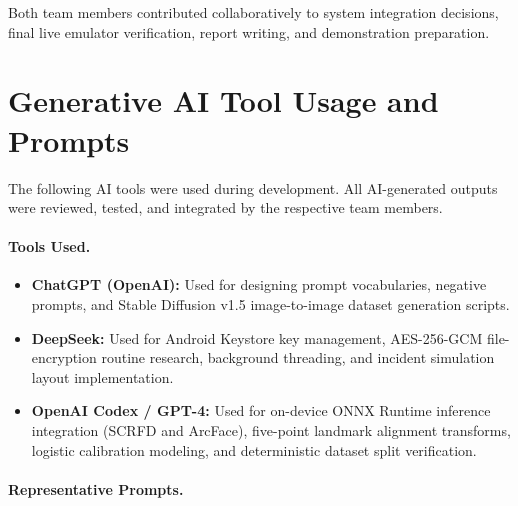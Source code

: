 \documentclass{article}
\begin{document}
Both team members contributed collaboratively to system integration decisions, final live emulator verification, report writing, and demonstration preparation.

\section{Generative AI Tool Usage and Prompts}

The following AI tools were used during development. All AI-generated outputs were reviewed, tested, and integrated by the respective team members.

\paragraph{Tools Used.}
\begin{itemize}
    \item \textbf{ChatGPT (OpenAI):} Used for designing prompt vocabularies, negative prompts, and Stable Diffusion v1.5 image-to-image dataset generation scripts.
    \item \textbf{DeepSeek:} Used for Android Keystore key management, AES-256-GCM file-encryption routine research, background threading, and incident simulation layout implementation.
    \item \textbf{OpenAI Codex / GPT-4:} Used for on-device ONNX Runtime inference integration (SCRFD and ArcFace), five-point landmark alignment transforms, logistic calibration modeling, and deterministic dataset split verification.
\end{itemize}

\paragraph{Representative Prompts.}
\end{document}
